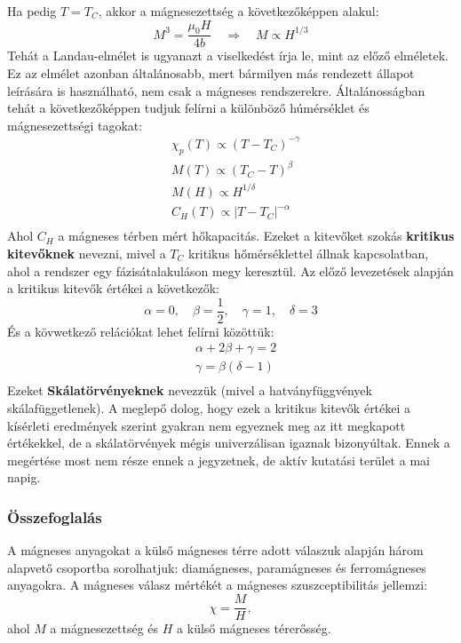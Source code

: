 \documentclass[../main.tex]{subfiles}
\begin{document}
Ha pedig $T = T_C$, akkor a mágnesezettség a következőképpen alakul:
\begin{equation}
    M^3 = \frac{\mu_0 H}{4 b} \quad \Rightarrow \quad M \propto H^{1/3}
\end{equation}
Tehát a Landau-elmélet is ugyanazt a viselkedést írja le, mint az előző elméletek. Ez az elmélet azonban általánosabb, mert bármilyen más rendezett állapot leírására is használható, nem csak a mágneses rendszerekre.
Általánosságban tehát a következőképpen tudjuk felírni a különböző húmérséklet és mágnesezettségi tagokat:
\begin{equation}
    \begin{aligned}
        & \chi_p (T) \propto (T - T_C)^{-\gamma} \\
        & M(T) \propto (T_C - T)^{\beta} \\
        & M(H) \propto H^{1/\delta} \\
        & C_H (T) \propto |T - T_C|^{-\alpha} \\
    \end{aligned}
\end{equation}
Ahol $C_H$ a mágneses térben mért hőkapacitás. Ezeket a kitevőket szokás \textbf{kritikus kitevőknek} nevezni, mivel a $T_C$ kritikus hőmérséklettel állnak kapcsolatban, ahol a rendszer egy fázisátalakuláson megy keresztül.
Az előző levezetések alapján a kritikus kitevők értékei a következők:
\begin{equation}
    \alpha = 0, \quad \beta = \frac{1}{2}, \quad \gamma = 1, \quad \delta = 3
\end{equation}
És a kövwetkező relációkat lehet felírni közöttük:
\begin{equation}
    \begin{aligned}
        & \alpha + 2 \beta + \gamma = 2 \\
        & \gamma = \beta (\delta - 1) \\
    \end{aligned}
\end{equation}
Ezeket \textbf{Skálatörvényeknek} nevezzük (mivel a hatványfüggvények skálafüggetlenek). A meglepő dolog, hogy ezek a kritikus kitevők értékei a kísérleti eredmények szerint gyakran nem egyeznek meg az
itt megkapott értékekkel, de a skálatörvények mégis univerzálisan igaznak bizonyúltak. Ennek a megértése most nem része ennek a jegyzetnek, de aktív kutatási terület a mai napig.
\subsubsection{Összefoglalás}
A mágneses anyagokat a külső mágneses térre adott válaszuk alapján három alapvető csoportba sorolhatjuk:
diamágneses, paramágneses és ferromágneses anyagokra. A mágneses válasz mértékét a mágneses
szuszceptibilitás jellemzi:
\[
\chi = \frac{M}{H},
\]
ahol $M$ a mágnesezettség és $H$ a külső mágneses térerősség.
\end{document}
